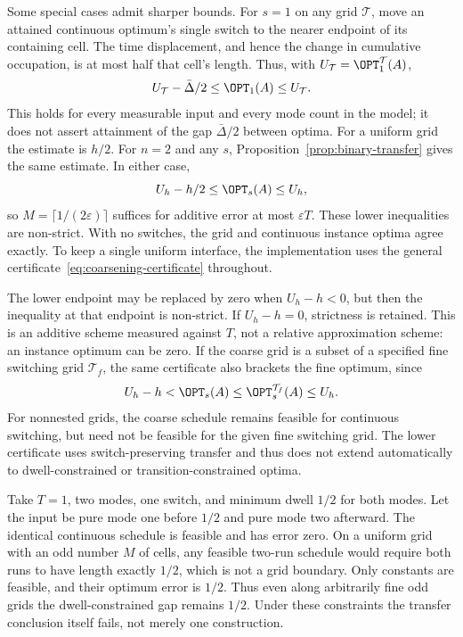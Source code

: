 Some special cases admit sharper bounds. For $s=1$ on any grid $\mathcal T$,
move an attained continuous optimum's single switch to the nearer endpoint
of its containing cell. The time displacement, and hence the change in
cumulative occupation, is at most half that cell's length. Thus, with
$U_{\mathcal T}=\OPT_1^{\mathcal T}(A)$,
\begin{equation}\label{eq:one-switch-arbitrary-grid-certificate}
 U_{\mathcal T}-\bar\Delta/2\le\OPT_1(A)\le U_{\mathcal T}.
\end{equation}
This holds for every measurable input and every mode count in the model;
it does not assert attainment of the gap $\bar\Delta/2$ between optima.
For a uniform grid the estimate is $h/2$. For $n=2$ and any $s$,
Proposition~\ref{prop:binary-transfer} gives the same estimate. In either case,
\[
 U_h-h/2\le\OPT_s(A)\le U_h,
\]
so $M=\lceil1/(2\varepsilon)\rceil$ suffices for additive error at most
$\varepsilon T$. These lower inequalities are non-strict. With no switches,
the grid and continuous instance optima agree exactly. To keep a single
uniform interface, the implementation uses the general
certificate~\eqref{eq:coarsening-certificate} throughout.

The lower endpoint may be replaced by zero when $U_h-h<0$, but then the
inequality at that endpoint is non-strict. If $U_h-h=0$, strictness is
retained. This is an additive scheme measured against $T$, not a relative
approximation scheme: an instance optimum can be zero. If the coarse grid
is a subset of a specified fine switching grid $\mathcal T_f$, the same
certificate also brackets the fine optimum, since
\[
 U_h-h<\OPT_s(A)\le\OPT_s^{\mathcal T_f}(A)\le U_h.
\]
For nonnested grids, the coarse schedule remains feasible for continuous
switching, but need not be feasible for the given fine switching grid.
The lower certificate uses switch-preserving transfer and thus does not
extend automatically to dwell-constrained or transition-constrained optima.

\begin{example}\label{ex:dwell-grid-gap}
Take $T=1$, two modes, one switch, and minimum dwell $1/2$ for both modes.
Let the input be pure mode one before $1/2$ and pure mode two afterward.
The identical continuous schedule is feasible and has error zero. On a
uniform grid with an odd number $M$ of cells, any feasible two-run schedule
would require both runs to have length exactly $1/2$, which is not a grid
boundary. Only constants are feasible, and their optimum error is $1/2$.
Thus even along arbitrarily fine odd grids the dwell-constrained gap remains
$1/2$. Under these constraints the transfer conclusion itself fails, not
merely one construction.
\end{example}

